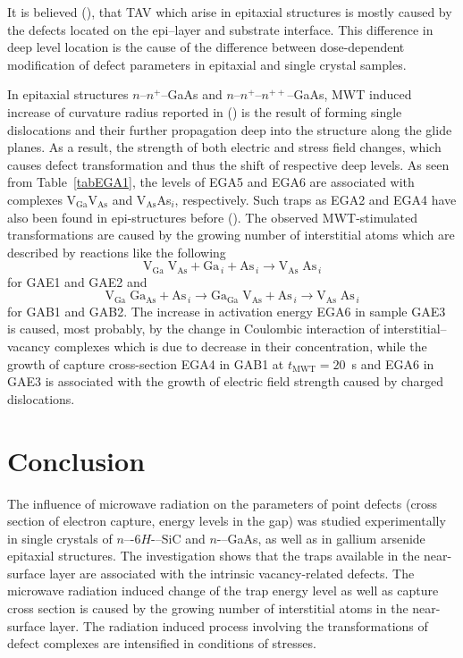 \documentclass[final,3p,times,twocolumn,authoryear]{elsarticle}
\begin{document}
It is believed (\cite{OstrovskiiSST,OlikhSSC,OstrovPAN}), that TAV
which arise in epitaxial structures
is mostly caused by the defects located on the epi--layer and substrate interface.
This difference in deep level location
is the cause of the difference between dose-dependent modification of defect parameters in epitaxial and single crystal samples.

In epitaxial structures $n$--$n^+$--GaAs and $n$--$n^+$--$n^{++}$--GaAs,
MWT induced increase of curvature radius reported in (\cite{BoltovetsEn,Konakova2012FTPEn})
is the result of forming single dislocations and their further propagation deep into the structure along the glide planes.
As a result, the strength of both electric and stress field changes,
which causes defect transformation and thus the shift of respective deep levels.
As seen from Table~\ref{tabEGA1}, the levels of EGA5 and EGA6 are associated with complexes   V$_\mathrm{Ga}$V$_\mathrm{As}$  and V$_\mathrm{As}$As$_i$, respectively.
Such traps as EGA2 and EGA4 have also been found in epi-structures before (\cite{Yousefi1995,Mircea1975,Bourgoin:GaAs,ASHBY:GaAs,Fang:EL6,Lefevre1977,KolFTP1989En}).
The observed MWT-stimulated transformations are caused by the growing number of interstitial atoms which are described by reactions like the following
\begin{displaymath}
  \mathrm{V}_\mathrm{Ga}\;\mathrm{V}_\mathrm{As}+\mathrm{Ga}_{\,i}+\mathrm{As}_{\,i} \rightarrow \mathrm{V}_\mathrm{As}\;\mathrm{As}_{\,i}
\end{displaymath}
for GAE1 and GAE2 and
\begin{displaymath}
  \mathrm{V}_\mathrm{Ga}\;\mathrm{Ga}_\mathrm{As}+\mathrm{As}_{\,i} \rightarrow
  \mathrm{Ga}_\mathrm{Ga}\;\mathrm{V}_\mathrm{As}+\mathrm{As}_{\,i} \rightarrow
  \mathrm{V}_\mathrm{As}\;\mathrm{As}_{\,i}
\end{displaymath}
for GAB1 and GAB2.
The increase in activation energy EGA6 in sample GAE3 is caused, most probably, by the change in
Coulombic interaction of interstitial--vacancy complexes
which is due to decrease in their concentration,
while the growth of capture cross-section EGA4 in GAB1 at $t_\mathrm{MWT}=20$~s
and EGA6 in GAE3 is associated with the growth of electric field strength caused by charged dislocations.

\section{Conclusion}
The influence of microwave radiation on the parameters of point defects (cross section of electron capture, energy levels in the gap)
was studied experimentally  in single crystals of $n$–-6$H$-–SiC and  $n$-–GaAs, as well as in gallium arsenide epitaxial structures.
The investigation shows that the traps available in the near-surface layer are associated with the intrinsic
vacancy-related defects.
The microwave radiation induced change of the trap energy level as well as capture cross section
is caused by the growing number of interstitial atoms in the near-surface layer.
The  radiation induced process involving the transformations of defect complexes are intensified in conditions of stresses.
\end{document}
